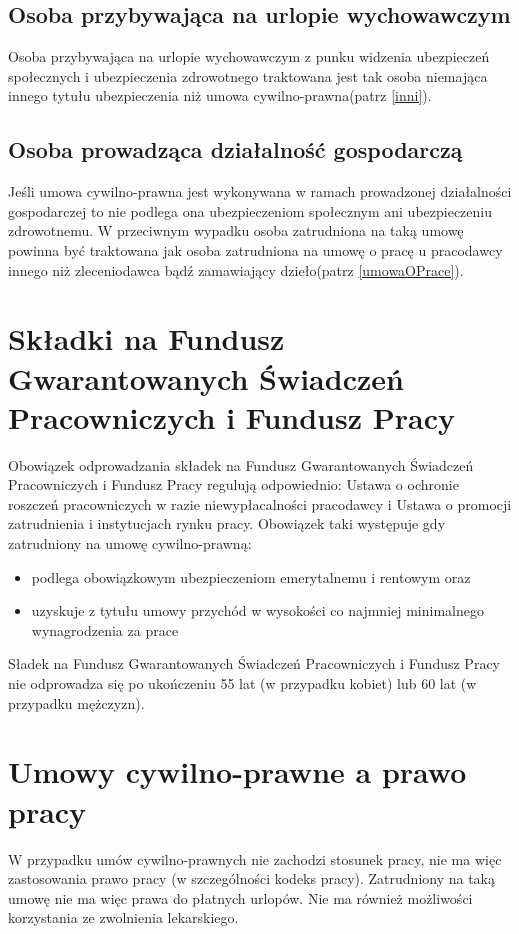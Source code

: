 \subsection[Osoba przybywająca na urlopie wychowawczym][Osoba przybywająca na urlopie wychowawczym]{Osoba przybywająca na urlopie wychowawczym}
Osoba przybywająca na urlopie wychowawczym z punku widzenia ubezpieczeń społecznych i ubezpieczenia zdrowotnego traktowana jest tak osoba niemająca innego tytułu ubezpieczenia niż umowa cywilno-prawna(patrz \ref{inni}).

\subsection[Osoba prowadząca działalność gospodarczą][Osoba prowadząca działalność gospodarczą]{Osoba prowadząca działalność gospodarczą}
Jeśli umowa cywilno-prawna jest wykonywana w ramach prowadzonej działalności gospodarczej to nie podlega ona ubezpieczeniom społecznym ani ubezpieczeniu zdrowotnemu. W przeciwnym wypadku osoba zatrudniona na taką umowę powinna być traktowana jak osoba zatrudniona na umowę o pracę u pracodawcy innego niż zleceniodawca bądź zamawiający dzieło(patrz \ref{umowaOPrace}).

\section{Składki na Fundusz Gwarantowanych Świadczeń Pracowniczych i Fundusz Pracy}
Obowiązek odprowadzania składek na Fundusz Gwarantowanych Świadczeń Pracowniczych i Fundusz Pracy regulują odpowiednio: Ustawa o ochronie roszczeń pracowniczych w razie niewypłacalności pracodawcy\cite{ustawaOOchronieRoszczen} i Ustawa o promocji zatrudnienia i instytucjach rynku pracy\cite{ustawaOPromocjiZatrudnienia}. Obowiązek taki występuje gdy zatrudniony na umowę cywilno-prawną:
\begin{itemize}
	\item podlega obowiązkowym ubezpieczeniom emerytalnemu i rentowym oraz
	\item uzyskuje z tytułu umowy przychód w wysokości co najmniej minimalnego wynagrodzenia za prace
\end{itemize}
Sładek na Fundusz Gwarantowanych Świadczeń Pracowniczych i Fundusz Pracy nie odprowadza się po ukończeniu 55 lat (w przypadku kobiet) lub 60 lat (w przypadku mężczyzn).

\section[Umowy cywilno-prawne a prawo pracy][Umowy cywilno-prawne a prawo pracy]{Umowy cywilno-prawne a prawo pracy}
W przypadku umów cywilno-prawnych nie zachodzi stosunek pracy, nie ma więc zastosowania prawo pracy (w szczególności kodeks pracy). Zatrudniony na taką umowę nie ma więc prawa do płatnych urlopów. Nie ma również możliwości korzystania ze zwolnienia lekarskiego.

